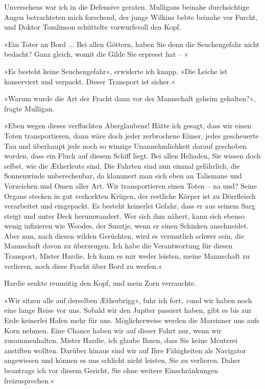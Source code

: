 Unversehens war ich in die Defensive geraten. Mulligans beinahe
durchsichtige Augen betrachteten mich forschend, der junge Wilkins
bebte beinahe vor Furcht, und Doktor Tomlinson schüttelte
vorwurfsvoll den Kopf.

»Ein Toter an Bord ... Bei allen Göttern, haben Sie denn die
Seuchengefahr nicht bedacht? Ganz gleich, womit die Gilde Sie
erpresst hat – «

»Es besteht keine Seuchengefahr«, erwiderte ich knapp. »Die Leiche
ist konserviert und verpackt. Dieser Transport ist sicher.«

»Warum wurde die Art der Fracht dann vor der Mannschaft geheim
gehalten?«, fragte Mulligan.

»Eben wegen dieses verfluchten Aberglaubens! Hätte ich gesagt, dass
wir einen Toten transportieren, dann wäre doch jeder zerbrochene
Eimer, jedes gescheuerte Tau und überhaupt jede noch so winzige
Unannehmlichkeit darauf geschoben worden, dass ein Fluch auf diesem
Schiff liegt. Bei allen Heliaden, Sie wissen doch selbst, wie die
Ætherleute sind. Die Fahrten sind nun einmal gefährlich, die
Sonnenwinde unberechenbar, da klammert man sich eben an Talismane
und Vorzeichen und Omen aller Art. Wir transportieren einen Toten –
na und? Seine Organe stecken in gut verkorkten Krügen, der
restliche Körper ist zu Dörrfleisch verarbeitet und eingepackt. Es
besteht keinerlei Gefahr, dass er aus seinem Sarg steigt und unter
Deck herumwandert. Wer sich ihm nähert, kann sich ebenso wenig
infizieren wie Woodes, der Smutje, wenn er einen Schinken
anschneidet. Aber nun, nach diesen wilden Gerüchten, wird es
vermutlich schwer sein, die Mannschaft davon zu überzeugen. Ich
habe die Verantwortung für diesen Transport, Mister Hardie. Ich
kann es mir weder leisten, meine Mannschaft zu verlieren, noch
diese Fracht über Bord zu werfen.«

Hardie senkte reumütig den Kopf, und mein Zorn verrauchte.

»Wir sitzen alle auf derselben Ætherbrigg«, fuhr ich fort, »und wir
haben noch eine lange Reise vor uns. Sobald wir den Jupiter
passiert haben, gibt es bis zur Erde keinerlei Hafen mehr für uns.
Möglicherweise werden die Marsianer uns aufs Korn nehmen. Eine
Chance haben wir auf dieser Fahrt nur, wenn wir zusammenhalten.
Mister Hardie, ich glaube Ihnen, dass Sie keine Meuterei anstiften
wollten. Darüber hinaus sind wir auf Ihre Fähigkeiten als Navigator
angewiesen und können es uns schlicht nicht leisten, Sie zu
verlieren. Daher beantrage ich vor diesem Gericht, Sie ohne weitere
Einschränkungen freizusprechen.«

